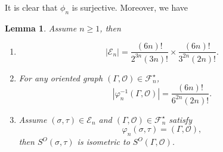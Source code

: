 \documentclass{amsart}
\theoremstyle{plain}
\newtheorem{lemma}[theorem]{Lemma}
\theoremstyle{definition}
\theoremstyle{remark}
\begin{document}
\noindent It is clear that $\phi_n$ is surjective. Moreover, we have
\begin{lemma}\label{l-des}Assume $n\geq 1$, then 
\begin{enumerate}
    \item $$|\mathcal{E}_n|=\frac{(6n)!}{2^{3n}(3n)!}\times \frac{(6n)!}{3^{2n} (2n)!}.$$
    \item For any oriented graph $(\Gamma,\mathcal{O})\in\mathcal{F}_n^\star$,
    $$|\varphi_n^{-1}(\Gamma,\mathcal{O})|=\frac{(6n)!}{6^{2n}(2n)!}.$$
    \item Assume $(\sigma,\tau)\in\mathcal{E}_n$ and $(\Gamma,\mathcal{O})\in\mathcal{F}_n^\star$ satisfy $$\varphi_n(\sigma,\tau)=(\Gamma,\mathcal{O}),$$  then $S^O(\sigma,\tau)$ is isometric to $S^O(\Gamma,\mathcal{O})$.
    \end{enumerate}
    \end{lemma}
\end{document}
